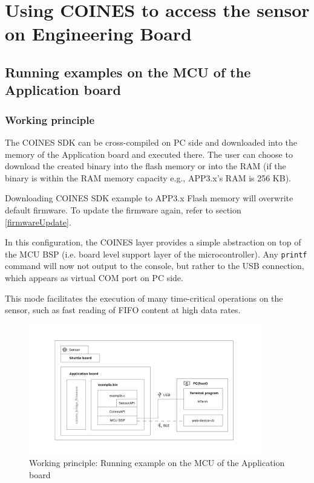 \documentclass{article}
\begin{document}
\section{Using COINES to access the sensor on Engineering Board} \label{coines}

\subsection{Running examples on the MCU of the Application board}\label{ExampleOnMCU}
\subsubsection{Working principle}
The COINES SDK can be cross-compiled on PC side and downloaded into the memory of the Application board and executed there. The user can choose to download the created binary into the flash memory or into the RAM (if the binary is within the RAM memory capacity e.g., APP3.x's RAM is 256 KB).

Downloading COINES SDK example to APP3.x Flash memory will overwrite default firmware. To update the firmware again, refer to section \ref{firmwareUpdate}.

In this configuration, the COINES layer provides a simple abstraction on top of the MCU BSP (i.e. board level support layer of the microcontroller). Any \texttt{printf} command will now not output to the console, but rather to the USB connection, which appears as virtual COM port on PC side.

This mode facilitates the execution of many time-critical operations on the sensor, such as fast reading of FIFO content at high data rates.

\begin{figure}[H]
	\begin{center}
		\includegraphics[width=0.9\textwidth]{coinesAPI_images/COINES_workingPrinciple_runOnMCU.png}
		\caption{Working principle: Running example on the MCU of the Application board}
	\end{center}
\end{figure}
\end{document}
